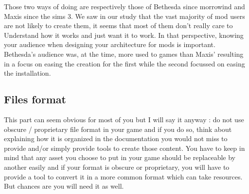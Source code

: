 \documentclass[a4paper,12pt]{article}
\begin{document}
Those two ways of doing are respectively those of Bethesda since morrowind and Maxis since the sims 3. We saw in our study that the vast majority of mod users are not likely to create them, it seems that most of them don't really care to Understand how it works and just want it to work. In that perspective, knowing your audience when designing your architecture for mods is important. Bethesda's audience was, at the time, more used to games than Maxis' resulting in a focus on easing the creation for the first while the second focussed on easing the installation.


\subsection{Files format}
This part can seem obvious for most of you but I will say it anyway : do not use obscure / proprietary file format in your game and if you do so, think about explaining how it is organized in the documentation you would not miss to provide and/or simply provide tools to create those content. You have to keep in mind that any asset you choose to put in your game should be replaceable by another easily and if your format is obscure or proprietary, you will have to provide a tool to convert it in a more common format which can take resources. But chances are you will need it as well.
\end{document}
